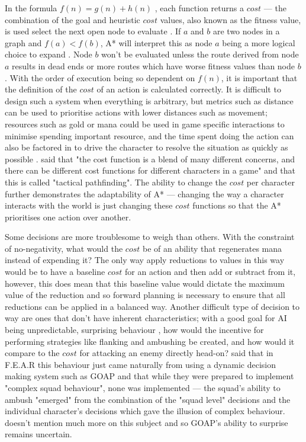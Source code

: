 \documentclass[11pt, a4paper]{article}
\begin{document}
In the formula $f(n) = g(n) + h(n)$ \parencite{hart1968formal}, each function returns a $cost$ --- the combination of the goal and heuristic $cost$ values, also known as the fitness value, is used select the next open node to evaluate \parencite[94]{russell2016artificial}. If $a$ and $b$ are two nodes in a graph and $f(a) < f(b)$, A* will interpret this as node $a$ being a more logical choice to expand \parencite[7]{orkin2003applying}. Node $b$ won't be evaluated unless the route derived from node $a$ results in dead ends or more routes which have worse fitness values than node $b$. With the order of execution being so dependent on $f(n)$, it is important that the definition of the $cost$ of an action is calculated correctly. It is difficult to design such a system when everything is arbitrary, but metrics such as distance can be used to prioritise actions with lower distances such as movement; resources such as gold or mana could be used in game specific interactions to minimise spending important resource, and the time spent doing the action can also be factored in to drive the character to resolve the situation as quickly as possible \parencite[8]{lester2005pathfinding}. \citeauthor{millington2019ai} \parencite*{millington2019ai} said that "the cost function is a blend of many different concerns, and there can be different cost functions for different characters in a game" and that this is called "tactical pathfinding". The ability to change the $cost$ per character further demonstrates the adaptability of A* --- changing the way a character interacts with the world is just changing these $cost$ functions so that the A* prioritises one action over another.

Some decisions are more troublesome to weigh than others. With the constraint of no-negativity, what would the $cost$ be of an ability that regenerates mana instead of expending it? The only way apply reductions to values in this way would be to have a baseline $cost$ for an action and then add or subtract from it, however, this does mean that this baseline value would dictate the maximum value of the reduction and so forward planning is necessary to ensure that all reductions can be applied in a balanced way. Another difficult type of decision to way are ones that don't have inherent characteristics; with a good goal for AI being unpredictable, surprising behaviour \parencite[17]{scott2002illusion}, how would the incentive for performing strategies like flanking and ambushing be created, and how would it compare to the $cost$ for attacking an enemy directly head-on? \citeauthor{orkin2006three} \parencite*[14]{orkin2006three} said that in F.E.A.R \parencite{FEAR} this behaviour just came naturally from using a dynamic decision making system such as GOAP and that while they were prepared to implement "complex squad behaviour", none was implemented --- the squad's ability to ambush "emerged" from the combination of the "squad level" decisions and the individual character's decisions which gave the illusion of complex behaviour. \citeauthor{orkin2006three} doesn't mention much more on this subject and so GOAP's ability to surprise remains uncertain.
\end{document}
